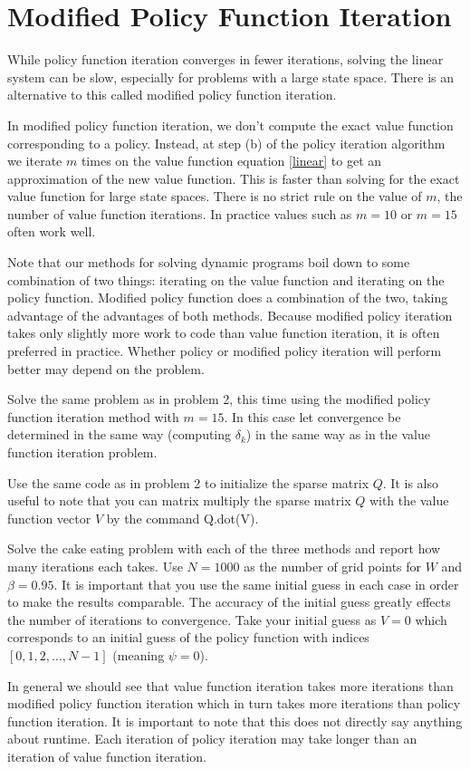 \section*{Modified Policy Function Iteration}

While policy function iteration converges in fewer iterations, solving the linear system can be slow, especially for problems with a large state space.  There is an alternative to this called modified policy function iteration.

In modified policy function iteration, we don't compute the exact value function corresponding to a policy.  Instead, at step (b) of the policy iteration algorithm we iterate $m$ times on the value function equation \eqref{linear} to get an approximation of the new value function.  This is faster than solving for the exact value function for large state spaces.  There is no strict rule on the value of $m$, the number of value function iterations.  In practice values such as $m=10$ or $m=15$ often work well.

Note that our methods for solving dynamic programs boil down to some combination of two things: iterating on the value function and iterating on the policy function.  Modified policy function does a combination of the two, taking advantage of the advantages of both methods.  Because modified policy iteration takes only slightly more work to code than value function iteration, it is often preferred in practice.  Whether policy or modified policy iteration will perform better may depend on the problem.

\begin{problem}
Solve the same problem as in problem 2, this time using the modified policy function iteration method with $m=15$.  In this case let convergence be determined in the same way (computing $\delta_k$) in the same way as in the value function iteration problem.

Use the same code as in problem 2 to initialize the sparse matrix $Q$.  It is also useful to note that you can matrix multiply the sparse matrix $Q$ with the value function vector $V$ by the command Q.dot(V).
\end{problem}

\begin{problem}
Solve the cake eating problem with each of the three methods and report how many iterations each takes.  Use $N= 1000$ as the number of grid points for $W$ and $\beta = 0.95$.  It is important that you use the same initial guess in each case in order to make the results comparable.  The accuracy of the initial guess greatly effects the number of iterations to convergence.  Take your initial guess as $V = 0$ which corresponds to an initial guess of the policy function with indices $[0,1,2,\ldots, N-1]$ (meaning $\psi = 0$).
\end{problem}

In general we should see that value function iteration takes more iterations than modified policy function iteration which in turn takes more iterations than policy function iteration.  It is important to note that this does not directly say anything about runtime.  Each iteration of policy iteration may take longer than an iteration of value function iteration.

